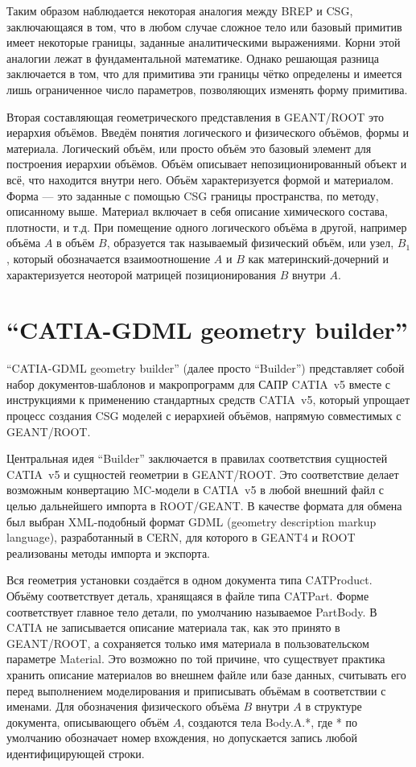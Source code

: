 Таким образом наблюдается некоторая аналогия между BREP и CSG, заключающаяся в том, что в любом случае сложное тело или базовый примитив имеет некоторые границы, заданные аналитическими выражениями. Корни этой аналогии лежат в фундаментальной математике. Однако решающая разница заключается в том, что для примитива эти границы чётко определены и имеется лишь ограниченное число параметров, позволяющих изменять форму примитива.

Вторая составляющая геометрического представления в GEANT/ROOT это иерархия объёмов. Введём понятия логического и физического объёмов, формы и материала. Логический объём, или просто объём это базовый элемент для построения иерархии объёмов. Объём описывает непозиционированный объект и всё, что находится внутри него. Объём характеризуется формой и материалом. Форма --- это заданные с помощью CSG границы пространства, по методу, описанному выше. Материал включает в себя описание химического состава, плотности, и т.д. При помещение одного логического объёма в другой, например объёма $A$ в объём $B$, образуется так называемый физический объём, или узел, $B_1$, который обозначается взаимоотношение $A$ и $B$ как материнский-дочерний и характеризуется неоторой матрицей позиционирования $B$ внутри $A$.

\section{``CATIA-GDML geometry builder''}\label{sec:Builder}

``CATIA-GDML geometry builder'' (далее просто ``Builder'') представляет собой набор документов-шаблонов и макропрограмм для САПР CATIA~v5 вместе с инструкциями к применению стандартных средств CATIA~v5, который упрощает процесс создания CSG моделей с иерархией объёмов, напрямую совместимых с GEANT/ROOT.

Центральная идея ``Builder'' заключается в правилах соответствия сущностей CATIA~v5 и сущностей геометрии в GEANT/ROOT. Это соответствие делает возможным конвертацию MC-модели в CATIA~v5 в любой внешний файл с целью дальнейшего импорта в ROOT/GEANT. В качестве формата для обмена был выбран XML-подобный формат GDML (geometry description markup language), разработанный в CERN, для которого в GEANT4 и ROOT реализованы методы импорта и экспорта.

Вся геометрия установки создаётся в одном документа типа CATProduct. Объёму соответствует деталь, хранящаяся в файле типа CATPart. Форме соответствует главное тело детали, по умолчанию называемое PartBody. В CATIA не записывается описание материала так, как это принято в GEANT/ROOT, а сохраняется только имя материала в пользовательском параметре Material. Это возможно по той причине, что существует практика хранить описание материалов во внешнем файле или базе данных, считывать его перед выполнением моделирования и приписывать объёмам в соответствии с именами. Для обозначения физического объёма $B$ внутри $A$ в структуре документа, описывающего объём $A$, создаются тела Body.A.*, где * по умолчанию обозначает номер вхождения, но допускается запись любой идентифицирующей строки.

